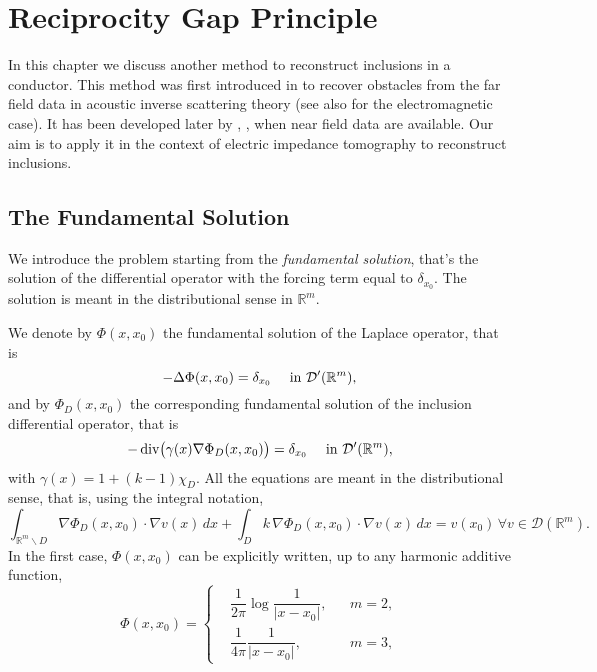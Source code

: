 \documentclass[10pt, a4paper, twoside, openright]{book}
\theoremstyle{definition}
\theoremstyle{plain}
\theoremstyle{plain}
\theoremstyle{plain}
\theoremstyle{plain}
\theoremstyle{plain}
\theoremstyle{plain}
\theoremstyle{plain}
\theoremstyle{plain}
\DeclareMathOperator{\divergence}{div}
\begin{document}
\chapter{Reciprocity Gap Principle}
\label{ch:reciprocity}
In this chapter we discuss another method to reconstruct inclusions in a conductor. 
This method was first introduced in \cite{colton-haddar:rg} to recover obstacles from the far field data in acoustic inverse scattering theory 
(see also \cite{cakoni-mbarek-haddar:electromagnetic} for the electromagnetic case). It has been developed later
by \cite{dicristo-sun:2006}, \cite{dicristo-sun:2007}, when near field data are available. Our aim is to apply it in the context of electric impedance tomography to reconstruct inclusions.
\section{The Fundamental Solution}
\label{subsection:fundamental-solution}
We introduce the problem starting from the \emph{fundamental solution}, that's the solution of 
the differential operator with the forcing term equal to $\delta_{x_0}$.
The solution is meant in the distributional sense in $\mathbb{R}^m$. 
\par
We denote by $\Phi(x,x_0)$ the fundamental solution of the Laplace operator, that is
\begin{equation}
 - \Delta \Phi(x,x_0) = \delta_{x_0} \quad \textup{ in }\mathcal{D}'(\mathbb{R}^m),\label{eq:fundamental-in-dist}
\end{equation}
and by $\Phi_D(x, x_0)$ the corresponding fundamental solution of the inclusion differential operator, that is
\begin{equation}
 - \divergence\bigl(\gamma(x)\nabla \Phi_D(x,x_0)\bigr) = \delta_{x_0}\quad\textup{ in }\mathcal{D}'(\mathbb{R}^m), \label{eq:fundamental-D-in-dist}
\end{equation}
with $\gamma(x) = 1+(k-1)\chi_D$. 
All the equations are meant in the distributional sense, that is, using the integral notation,
\begin{equation}
 \int_{\mathbb{R}^m \backslash D}\nabla \Phi_D(x,x_0) \cdot \nabla v(x) \, dx + \int_{D} k \, \nabla \Phi_D(x,x_0) \cdot \nabla v(x) \, dx = v(x_0) \, \forall v \in \mathcal{D}(\mathbb{R}^m).
\end{equation}
In the first case, $\Phi(x,x_0)$ can be explicitly written, up to any harmonic additive function,
\begin{equation}
\label{eq:definition-Phi-23}
  \Phi(x,x_0)=
  \left\{
  \begin{aligned}
   &\dfrac{1}{2\pi}\log\dfrac{1}{| x - x_0|}, && m=2, \\
   &\dfrac{1}{4\pi}\dfrac{1}{| x  - x_0|}, && m=3, 
  \end{aligned}
  \right.
\end{equation}
\end{document}
